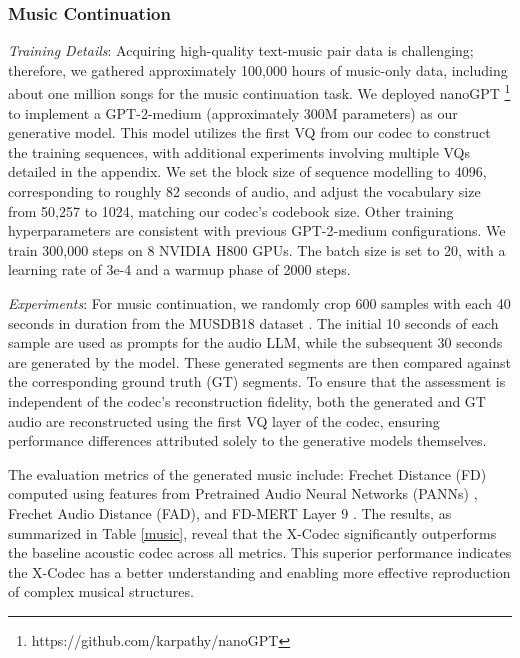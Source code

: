 \subsubsection{Music Continuation}

{\emph{Training Details}}: 
Acquiring high-quality text-music pair data is challenging; therefore, we gathered approximately 100,000 hours of music-only data, including about one million songs for the music continuation task. We deployed nanoGPT \footnote{https://github.com/karpathy/nanoGPT} to implement a GPT-2-medium (approximately 300M parameters) \cite{radford2019language} as our generative model. This model utilizes the first  VQ  from our codec to construct the training sequences, with additional experiments involving multiple VQs detailed in the appendix. We set the block size of sequence modelling to 4096, corresponding to roughly 82 seconds of audio, and adjust the vocabulary size from 50,257 to 1024, matching our codec's codebook size. Other training hyperparameters are consistent with previous GPT-2-medium configurations. We train 300,000 steps on 8 NVIDIA H800 GPUs. The batch size is set to 20, with a learning rate of 3e-4 and a warmup phase of 2000 steps.

\emph{Experiments}:
For music continuation, we randomly crop 600 samples with each 40 seconds in duration from the MUSDB18 dataset \cite{rafii2017musdb18}. The initial 10 seconds of each sample are used as prompts for the audio LLM, while the subsequent 30 seconds are generated by the model. These generated segments are then compared against the corresponding ground truth (GT) segments. To ensure that the assessment is independent of the codec's reconstruction fidelity, both the generated and GT audio are reconstructed using the first VQ layer of the codec, ensuring performance differences attributed solely to the generative models themselves.

The evaluation metrics of the generated music include: Frechet Distance (FD) computed using features from Pretrained Audio Neural Networks (PANNs) \cite{kong2020panns}, Frechet Audio Distance (FAD), and FD-MERT Layer 9 \cite{li2023mert}. The results, as summarized in Table \ref{music}, reveal that the X-Codec significantly outperforms the baseline acoustic codec across all metrics. This superior performance indicates the X-Codec has a better understanding and enabling more effective reproduction of complex musical structures.

